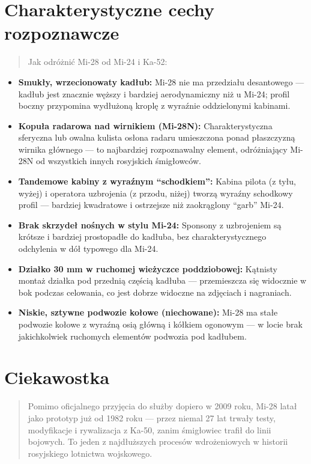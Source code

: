 \documentclass[12pt,openany,oneside]{book}
\providecommand{\tightlist}{%
  \setlength{\itemsep}{0pt}\setlength{\parskip}{0pt}}
\begin{document}
\section{Charakterystyczne cechy
rozpoznawcze}\label{charakterystyczne-cechy-rozpoznawcze-40}

\begin{quote}
Jak odróżnić Mi-28 od Mi-24 i Ka-52:
\end{quote}

\begin{itemize}
\tightlist
\item
  \textbf{Smukły, wrzecionowaty kadłub:} Mi-28 nie ma przedziału
  desantowego --- kadłub jest znacznie węższy i bardziej aerodynamiczny
  niż u Mi-24; profil boczny przypomina wydłużoną kroplę z wyraźnie
  oddzielonymi kabinami.
\item
  \textbf{Kopuła radarowa nad wirnikiem (Mi-28N):} Charakterystyczna
  sferyczna lub owalna kulista osłona radaru umieszczona ponad
  płaszczyzną wirnika głównego --- to najbardziej rozpoznawalny element,
  odróżniający Mi-28N od wszystkich innych rosyjskich śmigłowców.
\item
  \textbf{Tandemowe kabiny z wyraźnym ``schodkiem'':} Kabina pilota (z
  tyłu, wyżej) i operatora uzbrojenia (z przodu, niżej) tworzą wyraźny
  schodkowy profil --- bardziej kwadratowe i ostrzejsze niż zaokrąglony
  ``garb'' Mi-24.
\item
  \textbf{Brak skrzydeł nośnych w stylu Mi-24:} Sponsony z uzbrojeniem
  są krótsze i bardziej prostopadłe do kadłuba, bez charakterystycznego
  odchylenia w dół typowego dla Mi-24.
\item
  \textbf{Działko 30 mm w ruchomej wieżyczce poddziobowej:} Kątnisty
  montaż działka pod przednią częścią kadłuba --- przemieszcza się
  widocznie w bok podczas celowania, co jest dobrze widoczne na
  zdjęciach i nagraniach.
\item
  \textbf{Niskie, sztywne podwozie kołowe (niechowane):} Mi-28 ma stałe
  podwozie kołowe z wyraźną osią główną i kółkiem ogonowym --- w locie
  brak jakichkolwiek ruchomych elementów podwozia pod kadłubem.
\end{itemize}

\section{Ciekawostka}\label{ciekawostka-40}

\begin{quote}
Pomimo oficjalnego przyjęcia do służby dopiero w 2009 roku, Mi-28 latał
jako prototyp już od 1982 roku --- przez niemal 27 lat trwały testy,
modyfikacje i rywalizacja z Ka-50, zanim śmigłowiec trafił do linii
bojowych. To jeden z najdłuższych procesów wdrożeniowych w historii
rosyjskiego lotnictwa wojskowego.
\end{quote}
\end{document}
